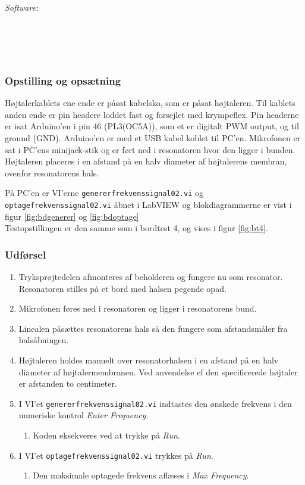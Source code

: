 		\textit{Software:}\\
		\labview\\
		\visa\\
		\vi\\
		\ardsw\\
		
		
		\subsubsection{Opstilling og opsætning}
		
		Højtalerkablets ene ende er påsat kabelsko, som er påsat højtaleren. Til kablets anden ende er pin headere loddet fast og forsejlet med krympeflex. Pin headerne er isat Arduino'en i pin 46 (PL3(OC5A)), som et er digitalt PWM output, og til ground (GND). 
		Arduino'en er med et USB kabel koblet til PC'en.	
		Mikrofonen er sat i PC'ens minijack-stik og er ført ned i resonatoren hvor den ligger i bunden. Højtaleren placeres i en afstand på en halv diameter af højtalerens membran, ovenfor resonatorens hals. 
		
		På PC'en er VI'erne \texttt{genererfrekvenssignal02.vi} og \texttt{optagefrekvenssignal02.vi} åbnet i LabVIEW og blokdiagrammerne er vist i figur \ref{fig:bdgenerer} og \ref{fig:bdoptage} \\ Testopstillingen er den samme som i bordtest 4, og vises i figur \ref{fig:bt4}.  
		

		\subsubsection{Udførsel}
			
			\begin{enumerate}
				\item Tryksprøjtedelen afmonteres af beholderen og fungere nu som resonator. Resonatoren stilles på et bord med halsen pegende opad. 
				\item Mikrofonen føres ned i resonatoren og ligger i resonatorens bund. 
				\item Linealen påsættes resonatorens hals så den fungere som afstandsmåler fra halsåbningen.
				\item Højtaleren holdes manuelt over resonatorhalsen i en afstand på en halv diameter af højtalermembranen. Ved anvendelse ef den specificerede højtaler er afstanden to centimeter. 
				\item I VI'et \texttt{genererfrekvenssignal02.vi} indtastes den ønskede frekvens i den numeriske kontrol \textit{Enter Frequency}. 
					\begin{enumerate}
						\item Koden eksekveres ved at trykke på \textit{Run}. 
					\end{enumerate} 
				\item I VI'et \texttt{optagefrekvenssignal02.vi} trykkes på \textit{Run}. 
					\begin{enumerate}
						\item Den maksimale optagede frekvens aflæses i \textit{Max Frequency}. 
					\end{enumerate}	 	
			\end{enumerate}
			
